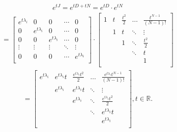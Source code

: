 \documentclass[letterpaper,10pt,english]{jupyterBook}
\begin{document}
\begin{equation*}
\begin{split}
    e^{tJ} = e^{tD+tN} = e^{tD} \cdot e^{tN}
\end{split}
\end{equation*}\begin{equation*}
\begin{split}
= \left[ {\begin{array}{ccccc}
    e^{t \lambda_i} & 0 & 0 & \dotsm & 0\\
    0 & e^{t \lambda_i} & 0 & \dotsm & 0\\
    0 & 0 & e^{t \lambda_i} & \dotsm & 0\\
    \vdots & \vdots & \vdots & \ddots & \vdots\\
    0 & 0 & 0 & \dotsm & e^{t \lambda_i}\\
\end{array} } \right] \cdot \left[ {\begin{array}{ccccc}
    1 & t & \frac{t^2}{2} & \dotsc & \frac{t^{N-1}}{(N-1)!}\\
     & 1 & t & \ddots & \vdots\\
     &  & 1 & \ddots & \frac{t^2}{2} \\
     &  &  & \ddots & t \\
     &  &  &  & 1 \\
\end{array} } \right]
\end{split}
\end{equation*}\begin{equation*}
\begin{split}
= \left[ {\begin{array}{ccccc}
    e^{t \lambda_i} & e^{t \lambda_i}t & \frac{e^{t \lambda_i} t^2}{2} & \dotsc & \frac{e^{t \lambda_i} t^{N-1}}{(N-1)!}\\
     & e^{t \lambda_i} & e^{t \lambda_i} t & \ddots & \vdots\\
     &  & e^{t \lambda_i} & \ddots & \frac{e^{t \lambda_i} t^2}{2} \\
     &  &  & \ddots & e^{t \lambda_i} t \\
     &  &  &  & e^{t \lambda_i} \\
\end{array} } \right], t \in \mathbb{R}.
\end{split}
\end{equation*}
\end{document}
